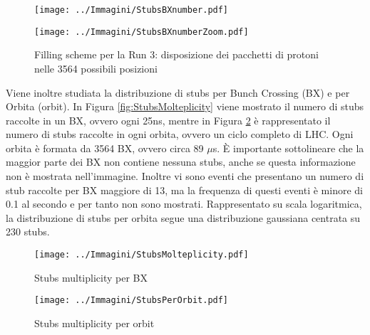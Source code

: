  \begin{figure}[t]
   \centering
   \begin{minipage}[b]{0.49\textwidth}
       \centering
       \texttt{[image: ../Immagini/StubsBXnumber.pdf]} 
     \end{minipage}
     \hfill 
     \begin{minipage}[b]{0.49\textwidth}
       \centering
       \texttt{[image: ../Immagini/StubsBXnumberZoom.pdf]} 
   \end{minipage}
   \caption{Filling scheme per la Run 3: disposizione dei pacchetti di protoni nelle 3564 possibili posizioni }
   \label{fig:Stubs1}
 \end{figure}


 Viene inoltre studiata la distribuzione di stubs per Bunch Crossing (BX) e per Orbita (orbit). In Figura \ref{fig:StubsMolteplicity} viene mostrato il numero di stubs raccolte in un BX, ovvero ogni 25ns, mentre in Figura \ref{fig:StubsPerOrbit} è rappresentato il numero di stubs raccolte in ogni orbita, ovvero un ciclo completo di LHC. Ogni orbita è formata da 3564 BX, ovvero circa 89 $\mu$s. \newline
 È importante sottolineare che la maggior parte dei BX non contiene nessuna stubs, anche se questa informazione non è mostrata nell'immagine. Inoltre vi sono eventi che presentano un numero di stub raccolte per BX maggiore di 13, ma la frequenza di questi eventi è minore di 0.1 al secondo e per tanto non sono mostrati. \newline
 Rappresentato su scala logaritmica, la distribuzione di stubs per orbita segue una distribuzione gaussiana centrata su 230 stubs. 

  \begin{figure}[h]
    \centering
    \begin{minipage}[b]{0.49\textwidth}
        \centering
        \texttt{[image: ../Immagini/StubsMolteplicity.pdf]} 
        \caption{Stubs multiplicity per BX}
        \label{fig:StubsMolteplicity}
      \end{minipage}
      \hfill 
      \begin{minipage}[b]{0.49\textwidth}
        \centering
        \texttt{[image: ../Immagini/StubsPerOrbit.pdf]} 
        \caption{Stubs multiplicity per orbit}
        \label{fig:StubsPerOrbit}
    \end{minipage}
  \end{figure}

